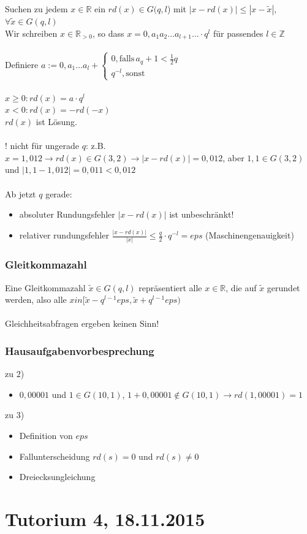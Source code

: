 \documentclass{llncs}
\begin{document}
Suchen zu jedem $x \in \mathbb{R}$ ein $rd(x)  \in G(q,l$) mit $|x-rd(x)| \leq |x-\tilde{x}|$, $\forall \tilde{x} \in G(q,l)$\\
Wir schreiben $x \in \mathbb{R}_{>0}$, so dass $x=0,a_1a_2...a_{l+1}... \cdot q^l$ f\"ur passendes $l \in \mathbb{Z}$\\
\\
Definiere $a:= 0,a_1...a_l + \begin{cases} 0, \text{falls} \, a_q+1 < \frac{1}{2}q \\ q^{-l}, \text{sonst}\end{cases}$\\
\\
$x \geq 0: rd(x) = a \cdot q^l$\\
$x<0: rd(x) = -rd(-x)$\\
$rd(x)$ ist L\"osung.\\
\\
! nicht f\"ur ungerade $q$: z.B. $x = 1,012 \longrightarrow rd(x) \in G(3,2) \longrightarrow |x-rd(x)| = 0,012$, aber $1,1 \in G(3,2)$ und $|1,1 - 1,012| = 0,011 < 0,012$\\
\\
Ab jetzt $q$ gerade:
\begin{itemize}
\item absoluter Rundungsfehler $|x-rd(x)|$ ist unbeschr\"ankt!
\item relativer rundungsfehler $\frac{|x-rd(x)|}{|x|} \leq \frac{q}{2} \cdot q^{-l} = eps$ (Maschinengenauigkeit)
\end{itemize}

\subsection*{Gleitkommazahl}

Eine Gleitkommazahl $\tilde{x} \in G(q,l)$ repr\"asentiert alle $x \in \mathbb{R}$, die auf $\tilde{x}$ gerundet werden, also alle $x in [\tilde{x} - q^{l-1}eps , \tilde{x} + q^{l-1}eps)$\\
\\
Gleichheitsabfragen ergeben keinen Sinn!

\subsection*{Hausaufgabenvorbesprechung}

zu 2)
\begin{itemize}
\item $0,00001$ und $1 \in G(10,1)$, $1+0,00001 \notin G(10,1) \longrightarrow rd(1,00001) = 1$
\end{itemize}
zu 3)
\begin{itemize}
\item Definition von $eps$
\item Fallunterscheidung $rd(s) = 0$ und $rd(s) \neq 0$
\item Dreiecksungleichung
\end{itemize}

\chapter*{Tutorium 4, 18.11.2015}
\end{document}
